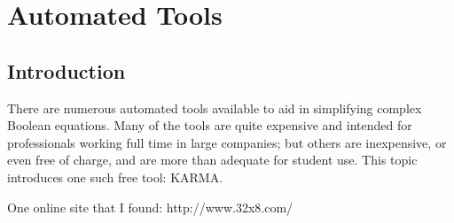 \clearpage\section{Automated Tools}
\label{ASM:sec:automated_tools}

\subsection{Introduction}
\label{ASM:subsec:introduction_to_automated_tools}

There are numerous automated tools available to aid in simplifying complex Boolean equations. Many of the tools are quite expensive and intended for professionals working full time in large companies; but others are inexpensive, or even free of charge, and are more than adequate for student use. This topic introduces one such free tool: \ac{KARMA}. 

One online site that I found: http://www.32x8.com/






























